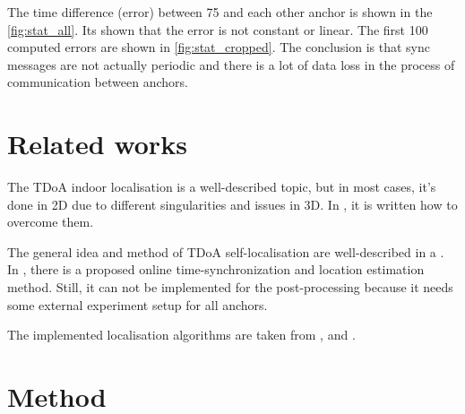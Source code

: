 \documentclass[journal]{IEEEtran}
\begin{document}
The time difference (error) between 75 and each other anchor is shown in the \autoref{fig:stat_all}. Its shown that the error is not constant or linear. The first 100 computed errors are shown in \autoref{fig:stat_cropped}. The conclusion is that sync messages are not actually periodic and there is a lot of data loss in the process of communication between anchors.

\section{Related works}
\label{sec:ps}
The TDoA indoor localisation is a well-described topic, but in most cases, it's done in 2D due to different singularities and issues in 3D. In \cite{Laaraiedh2009}, it is written how to overcome them. 

The general idea and method of TDoA self-localisation are well-described in a \cite{Keefe2017}. 
In \cite{Yuzan2019}, there is a proposed online time-synchronization and location estimation method. 
Still, it can not be implemented for the post-processing because it needs some external experiment setup for all anchors.

The implemented localisation algorithms are taken from \cite{Weng2011}, and \cite{Yuzan2019}.

\section{Method}
\label{sec:method}
\end{document}
